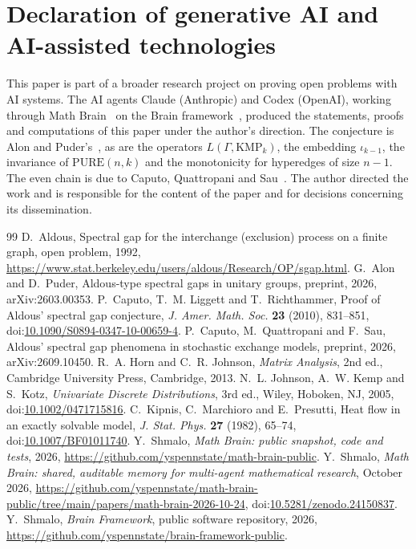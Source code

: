 \documentclass[11pt]{amsart}
\theoremstyle{remark}
\numberwithin{equation}{section}
\newcommand{\PURE}{\mathrm{PURE}}
\newcommand{\KMP}{\mathrm{KMP}}
\newcommand{\doi}[1]{doi:\href{https://doi.org/#1}{#1}}
\begin{document}
\section*{Declaration of generative AI and AI-assisted technologies}
This paper is part of a broader research project on proving open problems with AI systems. The AI agents Claude (Anthropic) and Codex (OpenAI), working through Math Brain~\cite{MathBrainRepo,MathBrainPaper} on the Brain framework~\cite{BrainFramework}, produced the statements, proofs and computations of this paper under the author's direction. The conjecture is Alon and Puder's~\cite{AP26}, as are the operators $L(\Gamma,\KMP_k)$, the embedding $\iota_{k-1}$, the invariance of $\PURE(n,k)$ and the monotonicity for hyperedges of size $n-1$. The even chain is due to Caputo, Quattropani and Sau~\cite{CQS26}. The author directed the work and is responsible for the content of the paper and for decisions concerning its dissemination.

\begin{thebibliography}{99}
 D.~Aldous, Spectral gap for the interchange (exclusion) process on a finite graph, open problem, 1992, \url{https://www.stat.berkeley.edu/users/aldous/Research/OP/sgap.html}.
 G.~Alon and D.~Puder, Aldous-type spectral gaps in unitary groups, preprint, 2026, arXiv:2603.00353.
 P.~Caputo, T.~M. Liggett and T.~Richthammer, Proof of Aldous' spectral gap conjecture, \emph{J. Amer. Math. Soc.} \textbf{23} (2010), 831--851, \doi{10.1090/S0894-0347-10-00659-4}.
 P.~Caputo, M.~Quattropani and F.~Sau, Aldous' spectral gap phenomena in stochastic exchange models, preprint, 2026, arXiv:2609.10450.
 R.~A. Horn and C.~R. Johnson, \emph{Matrix Analysis}, 2nd ed., Cambridge University Press, Cambridge, 2013.
 N.~L. Johnson, A.~W. Kemp and S.~Kotz, \emph{Univariate Discrete Distributions}, 3rd ed., Wiley, Hoboken, NJ, 2005, \doi{10.1002/0471715816}.
 C.~Kipnis, C.~Marchioro and E.~Presutti, Heat flow in an exactly solvable model, \emph{J. Stat. Phys.} \textbf{27} (1982), 65--74, \doi{10.1007/BF01011740}.
 Y.~Shmalo, \emph{Math Brain: public snapshot, code and tests}, 2026, \url{https://github.com/yspennstate/math-brain-public}.
 Y.~Shmalo, \emph{Math Brain: shared, auditable memory for multi-agent mathematical research}, October 2026, \url{https://github.com/yspennstate/math-brain-public/tree/main/papers/math-brain-2026-10-24}, \doi{10.5281/zenodo.24150837}.
 Y.~Shmalo, \emph{Brain Framework}, public software repository, 2026, \url{https://github.com/yspennstate/brain-framework-public}.
\end{thebibliography}
\end{document}
